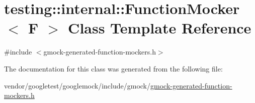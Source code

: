 \hypertarget{classtesting_1_1internal_1_1_function_mocker}{}\section{testing\+:\+:internal\+:\+:Function\+Mocker$<$ F $>$ Class Template Reference}
\label{classtesting_1_1internal_1_1_function_mocker}


{\ttfamily \#include $<$gmock-\/generated-\/function-\/mockers.\+h$>$}



The documentation for this class was generated from the following file\+:\begin{DoxyCompactItemize}
\item 
vendor/googletest/googlemock/include/gmock/\hyperlink{gmock-generated-function-mockers_8h}{gmock-\/generated-\/function-\/mockers.\+h}\end{DoxyCompactItemize}
